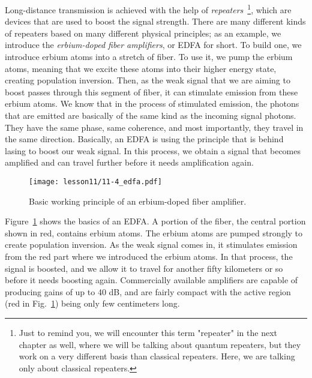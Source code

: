 Long-distance transmission is achieved with the help of \emph{repeaters}~\footnote{Just to remind you, we will encounter this term "repeater" in the next chapter as well, where we will be talking about quantum repeaters, but they work on a very different basis than classical repeaters. Here, we are talking only about classical repeaters.}, which are devices that are used to boost the signal strength. There are many different kinds of repeaters based on many different physical principles; as an example, we introduce the \emph{erbium-doped fiber amplifiers}, or EDFA for short. To build one, we introduce erbium atoms into a stretch of fiber. To use it, we pump the erbium atoms, meaning that we excite these atoms into their higher energy state, creating population inversion. Then, as the weak signal that we are aiming to boost passes through this segment of fiber, it can stimulate emission from these erbium atoms. We know that in the process of stimulated emission, the photons that are emitted are basically of the same kind as the incoming signal photons. They have the same phase, same coherence, and most importantly, they travel in the same direction. Basically, an EDFA is using the principle that is behind lasing to boost our weak signal. In this process, we obtain a signal that becomes amplified and can travel further before it needs amplification again.

\begin{figure}[t]
    \centering
    \texttt{[image: lesson11/11-4\_edfa.pdf]}
    \caption[Erbium-doped fiber amplifier (EDFA)]{Basic working principle of an erbium-doped fiber amplifier.}
    \label{fig:11-4_edfa}
\end{figure}

Figure~\ref{fig:11-4_edfa} shows the basics of an EDFA.
A portion of the fiber, the central portion shown in red, contains erbium atoms. The erbium atoms are pumped strongly to create population inversion. As the weak signal comes in, it stimulates emission from the red part where we introduced the erbium atoms. In that process, the signal is boosted, and we allow it to travel for another fifty kilometers or so before it needs boosting again.
Commercially available amplifiers are capable of producing gains of up to 40 dB, and are fairly compact with the active region (red in Fig.~\ref{fig:11-4_edfa}) being only few centimeters long.

